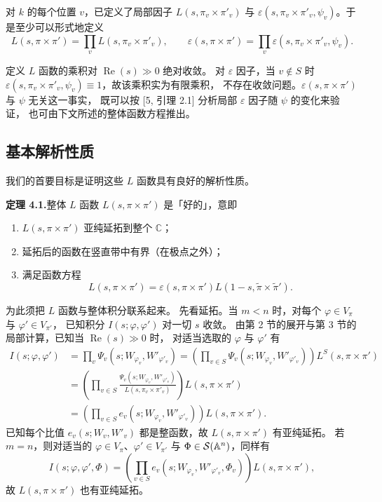 对 $k$ 的每个位置 $v$，已定义了局部因子 $L(s,\pi_v\times\pi'_v)$ 与
$\varepsilon(s,\pi_v\times\pi'_v,\psi_v)$。于是至少可以形式地定义
\[
L(s,\pi\times\pi')=\prod_vL(s,\pi_v\times\pi'_v),
\qquad
\varepsilon(s,\pi\times\pi')=\prod_v\varepsilon(s,\pi_v\times\pi'_v,\psi_v).
\]

定义 $L$ 函数的乘积对 $\operatorname{Re}(s)\gg0$ 绝对收敛。
对 $\varepsilon$ 因子，当 $v\notin S$ 时
$\varepsilon(s,\pi_v\times\pi'_v,\psi_v)\equiv1$，故该乘积实为有限乘积，
不存在收敛问题。$\varepsilon(s,\pi\times\pi')$ 与 $\psi$ 无关这一事实，
既可以按 [5, 引理 2.1] 分析局部 $\varepsilon$ 因子随 $\psi$ 的变化来验证，
也可由下文所述的整体函数方程推出。

\subsection{基本解析性质}

我们的首要目标是证明这些 $L$ 函数具有良好的解析性质。

\textbf{定理 4.1.}\quad 整体 $L$ 函数 $L(s,\pi\times\pi')$ 是「好的」，意即
\begin{enumerate}
\item $L(s,\pi\times\pi')$ 亚纯延拓到整个 $\mathbb{C}$；
\item 延拓后的函数在竖直带中有界（在极点之外）；
\item 满足函数方程
\[
L(s,\pi\times\pi')=\varepsilon(s,\pi\times\pi')
L(1-s,\widetilde{\pi}\times\widetilde{\pi}').
\]
\end{enumerate}

为此须把 $L$ 函数与整体积分联系起来。
先看延拓。当 $m<n$ 时，对每个 $\varphi\in V_\pi$ 与 $\varphi'\in V_{\pi'}$，
已知积分 $I(s;\varphi,\varphi')$ 对一切 $s$ 收敛。
由第 2 节的展开与第 3 节的局部计算，已知当 $\operatorname{Re}(s)\gg0$ 时，
对适当选取的 $\varphi$ 与 $\varphi'$ 有
\[
\begin{aligned}
I(s;\varphi,\varphi')&=\prod_v\Psi_v(s;W_{\varphi_v},W'_{\varphi'_v})
=\left(\prod_{v\in S}\Psi_v(s;W_{\varphi_v},W'_{\varphi'_v})\right)L^S(s,\pi\times\pi')\\
&=\left(\prod_{v\in S}\frac{\Psi_v(s;W_{\varphi_v},W'_{\varphi'_v})}
{L(s,\pi_v\times\pi'_v)}\right)L(s,\pi\times\pi')\\
&=\left(\prod_{v\in S}e_v(s;W_{\varphi_v},W'_{\varphi'_v})\right)L(s,\pi\times\pi').
\end{aligned}
\]
已知每个比值 $e_v(s;W_v,W'_v)$ 都是整函数，故 $L(s,\pi\times\pi')$ 有亚纯延拓。
若 $m=n$，则对适当的 $\varphi\in V_\pi$、$\varphi'\in V_{\pi'}$ 与
$\Phi\in\mathcal{S}(\mathbb{A}^n)$，同样有
\[
I(s;\varphi,\varphi',\Phi)=\left(\prod_{v\in S}e_v(s;W_{\varphi_v},W'_{\varphi'_v},\Phi_v)\right)
L(s,\pi\times\pi'),
\]
故 $L(s,\pi\times\pi')$ 也有亚纯延拓。

